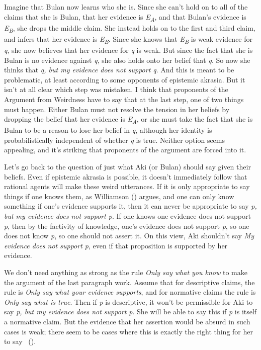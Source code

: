 \documentclass[
  10pt,
  letterpaper,
  twoside]{scrbook}
\begin{document}
Imagine that {Bulan} now learns who she is. Since she can't hold on to
all of the claims that she is {Bulan}, that her evidence is
\emph{E\textsubscript{A}}, and that {Bulan}'s evidence is
\emph{E\textsubscript{B}}, she drops the middle claim. She instead holds
on to the first and third claim, and infers that her evidence is
\emph{E\textsubscript{B}}. Since she knows that
\emph{E\textsubscript{B}} is weak evidence for \emph{q}, she now
believes that her evidence for \emph{q} is weak. But since the fact that
she is {Bulan} is no evidence against \emph{q}, she also holds onto her
belief that \emph{q}. So now she thinks that \emph{q, but my evidence
does not support q}. And this is meant to be problematic, at least
according to some opponents of epistemic akrasia. But it isn't at all
clear which step was mistaken. I think that proponents of the Argument
from Weirdness have to say that at the last step, one of two things must
happen. Either {Bulan} must not resolve the tension in her beliefs by
dropping the belief that her evidence is \emph{E\textsubscript{A}}, or
she must take the fact that she is {Bulan} to be a reason to lose her
belief in \emph{q}, although her identity is probabilistically
independent of whether \emph{q} is true. Neither option seems appealing,
and it's striking that proponents of the argument are forced into it.

Let's go back to the question of just what {Aki} (or Bulan) should say
given their beliefs. Even if epistemic akrasia is possible, it doesn't
immediately follow that rational agents will make these weird
utterances. If it is only appropriate to say things if one knows them,
as Williamson () argues, and one can
only know something if one's evidence supports it, then it can never be
appropriate to say \emph{p, but my evidence does not support p}. If one
knows one evidence does not support \emph{p}, then by the factivity of
knowledge, one's evidence does not support \emph{p}, so one does not
know \emph{p}, so one should not assert it. On this view, {Aki}
shouldn't say \emph{My evidence does not support p}, even if that
proposition is supported by her evidence.

We don't need anything as strong as the rule \emph{Only say what you
know} to make the argument of the last paragraph work. Assume that for
descriptive claims, the rule is \emph{Only say what your evidence
supports}, and for normative claims the rule is \emph{Only say what is
true}. Then if \emph{p} is descriptive, it won't be permissible for
{Aki} to say \emph{p, but my evidence does not support p}. She will be
able to say this if \emph{p} is itself a normative claim. But the
evidence that her assertion would be absurd in such cases is weak; there
seem to be cases where this is exactly the right thing for her to say
~().
\end{document}
